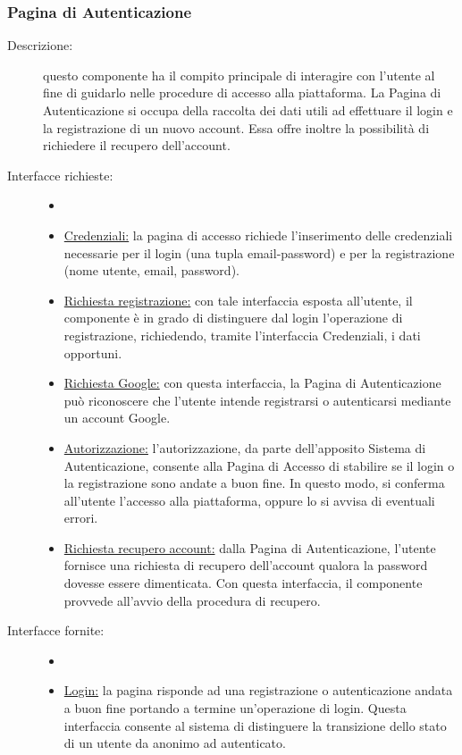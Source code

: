 \documentclass[11pt, a4paper]{article}
\theoremstyle{definition} %
\begin{document}
\iffalse
\subsubsection{Pagina di Autenticazione}
\begin{description}
    \item[Descrizione:] questo componente ha il compito
    principale di interagire con l'utente al fine di guidarlo
    nelle procedure di accesso alla piattaforma.
    La Pagina di Autenticazione si occupa della raccolta dei dati
    utili ad effettuare il login e la registrazione
    di un nuovo account. Essa offre inoltre la possibilità di
    richiedere il recupero dell'account.
    \item[Interfacce richieste:]
    \begin{itemize}
        \item[]
        \item \underline{Credenziali:} la pagina di accesso
        richiede l'inserimento delle credenziali necessarie
        per il login (una tupla email-password) e per la
        registrazione (nome utente, email, password).

        \item \underline{Richiesta registrazione:} con tale
        interfaccia esposta all'utente, il componente è in grado
        di distinguere dal login l'operazione di registrazione,
        richiedendo, tramite l'interfaccia Credenziali, i dati
        opportuni.

        \item \underline{Richiesta Google:} con questa interfaccia,
        la Pagina di Autenticazione può riconoscere che l'utente
        intende registrarsi o autenticarsi mediante un account
        Google.

        \item \underline{Autorizzazione:} l'autorizzazione, da
        parte dell'apposito Sistema di Autenticazione, consente
        alla Pagina di Accesso di stabilire se il login o la
        registrazione sono andate a buon fine. In questo modo, si
        conferma all'utente l'accesso alla piattaforma, oppure lo
        si avvisa di eventuali errori.

        \item \underline{Richiesta recupero account:} dalla Pagina
        di Autenticazione, l'utente fornisce una richiesta di
        recupero dell'account qualora la password dovesse essere
        dimenticata. Con questa interfaccia, il componente provvede
        all'avvio della procedura di recupero.
    \end{itemize}
    \item[Interfacce fornite:]
    \begin{itemize}
        \item[]
        \item \underline{Login:} la pagina risponde ad una registrazione
        o autenticazione andata a buon fine portando a termine un'operazione
        di login. Questa interfaccia consente al sistema di distinguere
        la transizione dello stato di un utente da anonimo ad autenticato.


\end{itemize}
\end{description}
\end{document}
